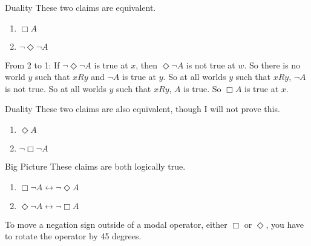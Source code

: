 \documentclass[
  14pt,
  letterpaper,
  ignorenonframetext,
  aspectratio=169,
]{beamer}
\providecommand{\tightlist}{%
  \setlength{\itemsep}{0pt}\setlength{\parskip}{0pt}}\usepackage{longtable,booktabs,array}
\begin{document}
\begin{frame}{Duality}
\protect\hypertarget{duality-1}{}
These two claims are equivalent.

\begin{enumerate}[<+->]
\tightlist
\item
  \(\Box A\)
\item
  \(\neg \Diamond \neg A\)
\end{enumerate}

From 2 to 1: If \(\neg \Diamond \neg A\) is true at \(x\), then
\(\Diamond \neg A\) is not true at \(w\). So there is no world \(y\)
such that \(xRy\) and \(\neg A\) is true at \(y\). So at all worlds
\(y\) such that \(xRy\), \(\neg A\) is not true. So at all worlds \(y\)
such that \(xRy\), \(A\) is true. So \(\Box A\) is true at \(x\).
\end{frame}

\begin{frame}{Duality}
\protect\hypertarget{duality-2}{}
These two claims are also equivalent, though I will not prove this.

\begin{enumerate}[<+->]
\tightlist
\item
  \(\Diamond A\)
\item
  \(\neg \Box \neg A\)
\end{enumerate}
\end{frame}

\begin{frame}{Big Picture}
\protect\hypertarget{big-picture}{}
These claims are both logically true.

\begin{enumerate}[<+->]
\tightlist
\item
  \(\Box \neg A \leftrightarrow \neg \Diamond A\)
\item
  \(\Diamond \neg A \leftrightarrow \neg \Box A\)
\end{enumerate}

To move a negation sign outside of a modal operator, either \(\Box\) or
\(\Diamond\), you have to rotate the operator by 45 degrees.
\end{frame}
\end{document}
